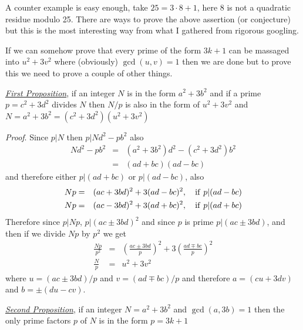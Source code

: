 \documentclass[aps,preprint,preprintnumbers,nofootinbib,showpacs,prd]{revtex4-1}
\newcommand{\nbea}{\begin{eqnarray*}}
\newcommand{\neea}{\end{eqnarray*}}
\begin{document}
A counter example is easy enough, take $25 = 3 \cdot 8 + 1$, here $8$ is not a quadratic residue modulo 25. There are ways to prove the above assertion (or conjecture) but this is the most interesting way from what I gathered from rigorous googling.

If we can somehow prove that every prime of the form $3k + 1$ can be massaged into $u^2 + 3v^2$ where (obviously) $\gcd(u,v)=1$ then we are done but to prove this we need to prove a couple of other things.

\underline{\it First Proposition}, if an integer $N$ is in the form $a^2 + 3b^2$ and if a prime $p = c^2 + 3d^2$ divides $N$ then $N/p$ is also in the form of $u^2 + 3v^2$  and $N = a^2 + 3b^2 = (c^2 + 3d^2)(u^2 + 3v^2)$

{\it Proof}. Since $p|N$ then $p| Nd^2 - pb^2$ also
%
\nbea
Nd^2 - pb^2 & = & (a^2 + 3b^2)d^2 - (c^2 + 3d^2)b^2 \\
& = & (ad + bc)(ad - bc)
\neea
%
and therefore either $p|(ad + bc)$ or $p|(ad - bc)$, also
%
\nbea
Np & = & (ac + 3bd)^2 + 3(ad - bc)^2, ~~~{\rm if~} p|(ad - bc) \\
Np & = & (ac - 3bd)^2 + 3(ad + bc)^2, ~~~{\rm if~} p|(ad + bc)
\neea
%
Therefore since $p|Np$, $p|(ac \pm 3bd)^2$ and since $p$ is prime $p|(ac \pm 3bd)$, and then if we divide $Np$ by $p^2$ we get
%
\nbea
\frac{Np}{p^2} & = & \left ( \frac{ac \pm 3bd}{p}\right )^2 + 3 \left ( \frac{ad \mp bc}{p} \right )^2 \\
\frac{N}{p} & = & u^2 + 3v^2
\neea
%
where $u = (ac \pm 3bd)/p$ and $v = (ad \mp bc)/p$ and therefore $a = (cu + 3dv)$ and $b = \pm(du-cv)$.

\underline{\it Second Proposition}, if an integer $N = a^2 + 3b^2$ and $\gcd(a,3b) = 1$ then the only prime factors $p$ of $N$ is in the form $p = 3k+1$
\end{document}
